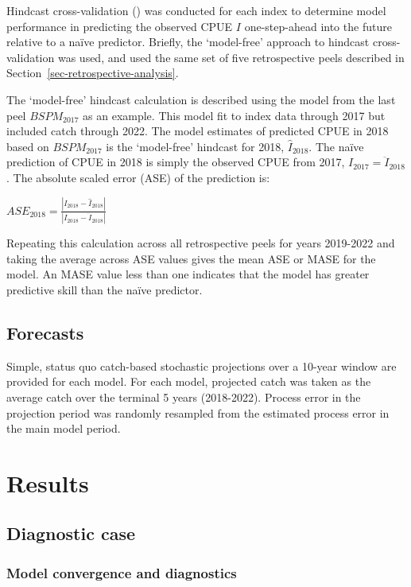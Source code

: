 \documentclass[
  11pt,
]{SCreport}
\begin{document}
Hindcast cross-validation () was conducted for each index to determine model performance
in predicting the observed CPUE \(I\) one-step-ahead into the future
relative to a naïve predictor. Briefly, the `model-free' approach to
hindcast cross-validation was used, and used the same set of five
retrospective peels described in
Section~\ref{sec-retrospective-analysis}.

The `model-free' hindcast calculation is described using the model from
the last peel \(BSPM_{2017}\) as an example. This model fit to index
data through 2017 but included catch through 2022. The model estimates
of predicted CPUE in 2018 based on \(BSPM_{2017}\) is the `model-free'
hindcast for 2018, \(\hat{I}_{2018}\). The naïve prediction of CPUE in
2018 is simply the observed CPUE from 2017,
\(I_{2017} = \ddot{I}_{2018}\). The absolute scaled error (ASE) of the
prediction is:

\(ASE_{2018} = \frac{|I_{2018} - \hat{I}_{2018}|}{|I_{2018} - \ddot{I}_{2018}|}\)

Repeating this calculation across all retrospective peels for years
2019-2022 and taking the average across ASE values gives the mean ASE or
MASE for the model. An MASE value less than one indicates that the model
has greater predictive skill than the naïve predictor.

\subsection{Forecasts}\label{forecasts}

Simple, status quo catch-based stochastic projections over a 10-year
window are provided for each model. For each model, projected catch was
taken as the average catch over the terminal 5 years (2018-2022).
Process error in the projection period was randomly resampled from the
estimated process error in the main model period.

\section{Results}\label{sec-results}

\subsection{Diagnostic case}\label{diagnostic-case}

\subsubsection{Model convergence and
diagnostics}\label{sec-model-convergence}
\end{document}
